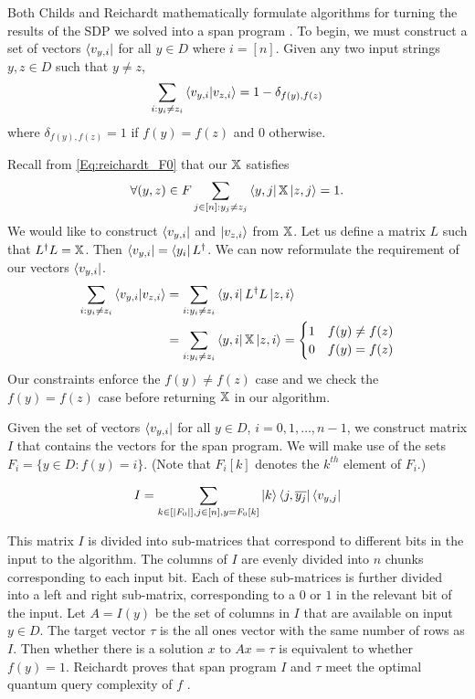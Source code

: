 Both Childs and Reichardt mathematically formulate
algorithms for turning the results of the SDP we solved
into a span program \cite{reichardt2009span, childs}. To
begin, we must construct a set of vectors
$\bra{v_{y,i}}$ for all $y \in D$ where $i = [n]$.
Given any two input strings $y, z \in D$ such that $y\neq z$,
\begin{align}
    \sum_{i: y_i \ne z_i} \braket{v_{y,i}|v_{z,i}} = 1 - \delta_{f(y), f(z)} \nonumber
\end{align}
where $\delta_{f(y), f(z)} = 1$ if $f(y) = f(z)$ and $0$ otherwise.

Recall from \cref{Eq:reichardt_F0} that our $\operatorname{\mathbb{X}}$ satisfies
\begin{align}
    \forall (y,z) \in F \sum_{j \in [n]: y_j \ne z_j} 
    \bra{y,j} \operatorname{\mathbb{X}} \ket{z, j} = 1 \nonumber.
\end{align}
We would like to construct $\bra{v_{y,i}}$ and $\ket{v_{z,i}}$
from $\operatorname{\mathbb{X}}$.
Let us define a matrix $L$ such that $L^\dagger L = \operatorname{\mathbb{X}}$.
Then $\bra{v_{y,i}} = \bra{y_i}L^\dagger$.
We can now reformulate the requirement of our vectors $\bra{v_{y,i}}$. 
\begin{align}
    \sum_{i: y_i \ne z_i} \braket{v_{y,i}|v_{z,i}} &= \sum_{i: y_i \ne z_i}
    \bra{y,i} L^\dagger L \ket{z, i} \nonumber \\
    &= \sum_{i: y_i \ne z_i} \bra{y,i} \operatorname{\mathbb{X}} \ket{z, i} = \begin{cases}
        1 & f(y) \ne f(z) \\
        0 & f(y) = f(z)
    \end{cases} \nonumber 
\end{align}
Our constraints enforce the $f(y) \neq f(z)$ case and we
check the $f(y) = f(z)$ case before returning $\operatorname{\mathbb{X}}$ in our algorithm.

Given the set of vectors $\bra{v_{y,i}}$ for all $y \in
D$, $i = 0, 1, \ldots , n-1$, we construct 
matrix $I$ that contains the vectors for the span
program. We will make use of the sets $F_i =
\{y \in D: f(y) = i\}$.
(Note that $F_i[k]$ denotes the $k^{th}$ element of $F_i$.)

\begin{align}
    I = \sum_{k \in [|F_0|], j \in [n], y = F_0[k]}
    \ket{k}\bra{j, \overline{y_j}} \bra{v_{y,j}}
    \nonumber
\end{align}

This matrix $I$ is divided into sub-matrices that
correspond to different bits in the input to the
algorithm.
The columns of $I$ are evenly divided into
$n$ chunks corresponding to each input bit.
Each of these sub-matrices is further divided into a left and
right sub-matrix, corresponding to a $0$ or $1$
in the relevant bit of the input.
Let $A=I(y)$ be the set of columns in $I$ that are available
on input $y \in D$.
The target vector $\tau$ is the all ones vector with the same number
of rows as $I$.
Then whether there is a solution $x$ to $Ax = \tau$ is equivalent
to whether $f(y) = 1$.
Reichardt proves that span program $I$ and $\tau$ meet
the optimal quantum query complexity of $f$ \cite{reichardt2009span}.
